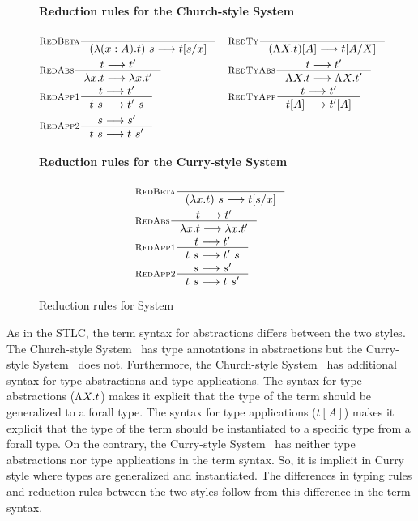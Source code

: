 \begin{figure}
\paragraph{Reduction rules for the Church-style System \F}
\begin{align*}
& \inference[\sc RedBeta]{}{(\l(x:A).t)~s --> t[s/x]}
&&\inference[\sc RedTy]{}{(\L X   .t)[A] --> t[A/X]} \\
& \inference[\sc RedAbs]{t --> t'}{\l x   .t --> \l x   .t'}
&&\inference[\sc RedTyAbs]{t --> t'}{\L X   .t --> \L X   .t'} \\
& \inference[\sc RedApp1]{t --> t'}{t~s --> t'~s}
&&\inference[\sc RedTyApp]{t --> t'}{t[A] --> t'[A]} \\
& \inference[\sc RedApp2]{s --> s'}{t~s --> t~s'}
\end{align*}
\paragraph{Reduction rules for the Curry-style System \F}
\begin{align*}
& \inference[\sc RedBeta]{}{(\l x   .t)~s --> t[s/x]} \\
& \inference[\sc RedAbs]{t --> t'}{\l x   .t --> \l x   .t'} \\
& \inference[\sc RedApp1]{t --> t'}{t~s --> t'~s} \\
& \inference[\sc RedApp2]{s --> s'}{t~s --> t~s'}
\end{align*}
\caption{Reduction rules for System \F}
\label{fig:redf}
\end{figure}



As in the STLC, the term syntax for abstractions differs between the two styles.
The Church-style System \F\ has type annotations in abstractions but
the Curry-style System \F\ does not. Furthermore, the Church-style System \F\
has additional syntax for type abstractions and type applications. The syntax
for type abstractions ($\Lambda X.t$) makes it explicit that the type of the term
should be generalized to a forall type. The syntax for type applications
($t[A]$) makes it explicit that the type of the term should be instantiated to
a specific type from a forall type. On the contrary, the Curry-style System \F\
has neither type abstractions nor type applications in the term syntax.
So, it is implicit in Curry style where types are generalized and instantiated.
The differences in typing rules and reduction rules between the two styles
follow from this difference in the term syntax.

